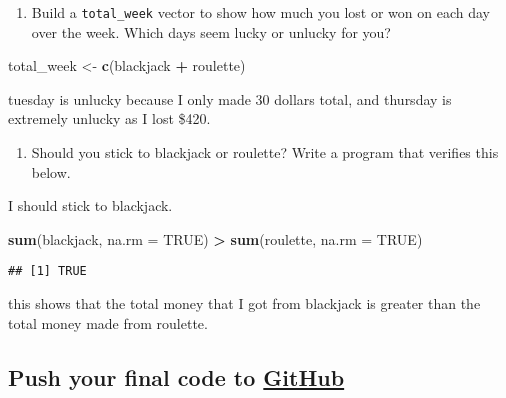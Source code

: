 \documentclass[]{article}
\newenvironment{Shaded}{\begin{snugshade}}{\end{snugshade}}
\newcommand{\DataTypeTok}[1]{\textcolor[rgb]{0.13,0.29,0.53}{#1}}
\newcommand{\KeywordTok}[1]{\textcolor[rgb]{0.13,0.29,0.53}{\textbf{#1}}}
\newcommand{\NormalTok}[1]{#1}
\newcommand{\OperatorTok}[1]{\textcolor[rgb]{0.81,0.36,0.00}{\textbf{#1}}}
\newcommand{\OtherTok}[1]{\textcolor[rgb]{0.56,0.35,0.01}{#1}}
\newcommand{\StringTok}[1]{\textcolor[rgb]{0.31,0.60,0.02}{#1}}
\providecommand{\tightlist}{%
  \setlength{\itemsep}{0pt}\setlength{\parskip}{0pt}}
\begin{document}
\begin{enumerate}
\def\labelenumi{\alph{enumi}.}
\setcounter{enumi}{4}
\tightlist
\item
  Build a \texttt{total\_week} vector to show how much you lost or won
  on each day over the week. Which days seem lucky or unlucky for you?
\end{enumerate}

\begin{Shaded}
\begin{Highlighting}[]
\NormalTok{total_week <-}\StringTok{ }\KeywordTok{c}\NormalTok{(blackjack }\OperatorTok{+}\StringTok{ }\NormalTok{roulette)}
\end{Highlighting}
\end{Shaded}

tuesday is unlucky because I only made 30 dollars total, and thursday is
extremely unlucky as I lost \$420.

\begin{enumerate}
\def\labelenumi{\alph{enumi}.}
\setcounter{enumi}{5}
\tightlist
\item
  Should you stick to blackjack or roulette? Write a program that
  verifies this below.
\end{enumerate}

I should stick to blackjack.

\begin{Shaded}
\begin{Highlighting}[]
\KeywordTok{sum}\NormalTok{(blackjack, }\DataTypeTok{na.rm =} \OtherTok{TRUE}\NormalTok{) }\OperatorTok{>}\StringTok{ }\KeywordTok{sum}\NormalTok{(roulette, }\DataTypeTok{na.rm =} \OtherTok{TRUE}\NormalTok{)}
\end{Highlighting}
\end{Shaded}

\begin{verbatim}
## [1] TRUE
\end{verbatim}

this shows that the total money that I got from blackjack is greater
than the total money made from roulette.

\hypertarget{push-your-final-code-to-github}{%
\subsection{\texorpdfstring{Push your final code to
\href{https://github.com/FRS417-DataScienceBiologists}{GitHub}}{Push your final code to GitHub}}\label{push-your-final-code-to-github}}
\end{document}
